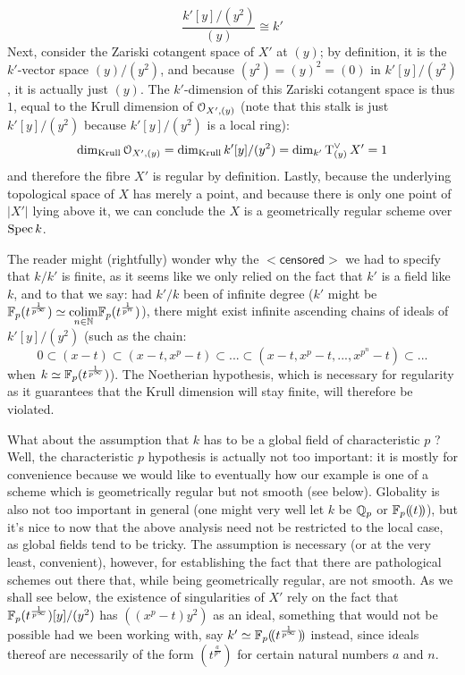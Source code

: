 \begin{example}
\begin{enumerate}
                            $$\frac{k'[y]/(y^2)}{(y)} \cong k'$$
                        Next, consider the Zariski cotangent space of $X'$ at $(y)$; by definition, it is the $k'$-vector space $(y)/(y^2)$, and because $(y^2) = (y)^2 = (0)$ in $k'[y]/(y^2)$, it is actually just $(y)$. The $k'$-dimension of this Zariski cotangent space is thus $1$, equal to the Krull dimension of $\mathcal{O}_{X', (y)}$ (note that this stalk is just $k'[y]/(y^2)$ because $k'[y]/(y^2)$ is a local ring):
                            $$\dim_{\mathrm{Krull}} \mathcal{O}_{X', (y)} = \dim_{\mathrm{Krull}} k'[y]/(y^2) = \dim_{k'} \operatorname{T}^{\vee}_{(y)} X' = 1$$
                        and therefore the fibre $X'$ is regular by definition. Lastly, because the underlying topological space of $X$ has merely a point, and because there is only one point of $|X'|$ lying above it, we can conclude the $X$ is a geometrically regular scheme over $\operatorname{Spec} k$. 
                        
                        The reader might (rightfully) wonder why the $\mathsf{<censored>}$ we had to specify that $k/k'$ is finite, as it seems like we only relied on the fact that $k'$ is a field like $k$, and to that we say: had $k'/k$ been of infinite degree ($k'$ might be $\mathbb{F}_p(t^{\frac{1}{p^{\infty}}}) \simeq \underset{n \in \mathbb{N}}{\operatorname{colim}} \mathbb{F}_p(t^{\frac{1}{p^n}})$), there might exist infinite ascending chains of ideals of $k'[y]/(y^2)$ (such as the chain:
                            $$0 \subset (x - t) \subset (x - t, x^p - t) \subset ... \subset (x - t, x^p - t, ..., x^{p^n} - t) \subset ...$$
                        when $k \simeq \mathbb{F}_p(t^{\frac{1}{p^{\infty}}})$). The Noetherian hypothesis, which is necessary for regularity as it guarantees that the Krull dimension will stay finite, will therefore be violated. 
                        
                        What about the assumption that $k$ has to be a global field of characteristic $p$ ? Well, the characteristic $p$ hypothesis is actually not too important: it is mostly for convenience because we would like to eventually how our example is one of a scheme which is geometrically regular but not smooth (see below). Globality is also not too important in general (one might very well let $k$ be $\mathbb{Q}_p$ or $\mathbb{F}_p(\!(t)\!)$), but it's nice to now that the above analysis need not be restricted to the local case, as global fields tend to be tricky. The assumption is necessary (or at the very least, convenient), however, for establishing the fact that there are pathological schemes out there that, while being geometrically regular, are not smooth. As we shall see below, the existence of singularities of $X'$ rely on the fact that $\mathbb{F}_p(t^{\frac{1}{p^{\infty}}})[y]/(y^2)$ has $\left((x^p - t)y^2\right)$ as an ideal, something that would not be possible had we been working with, say $k' \simeq \mathbb{F}_p(\!(t^{\frac{1}{p^{\infty}}})\!)$ instead, since ideals thereof are necessarily of the form $(t^{\frac{a}{p^n}})$ for certain natural numbers $a$ and $n$. 
                        

\end{enumerate}
\end{example}
